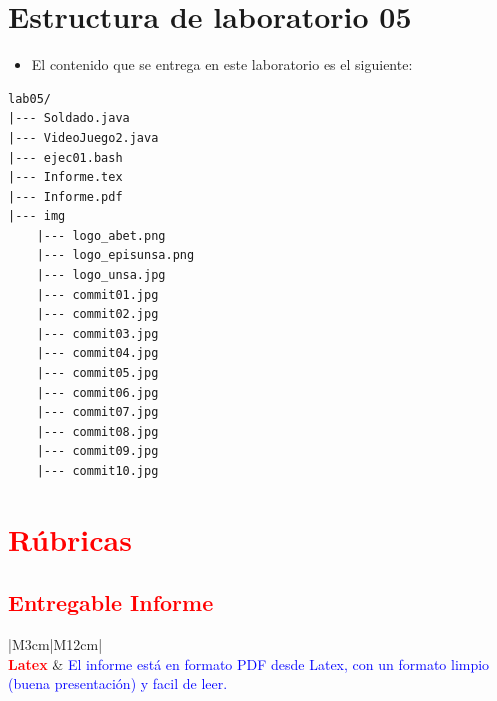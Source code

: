 \documentclass{article}
\newcommand{\itemPracticeNumber}{05}
\begin{document}
\section{Estructura de laboratorio \itemPracticeNumber}
\begin{itemize}
	\item El contenido que se entrega en este laboratorio es el siguiente:
\end{itemize}
\begin{lstlisting}[style=ascii-tree]
lab05/
|--- Soldado.java
|--- VideoJuego2.java
|--- ejec01.bash
|--- Informe.tex
|--- Informe.pdf
|--- img
	|--- logo_abet.png
	|--- logo_episunsa.png
	|--- logo_unsa.jpg
	|--- commit01.jpg
	|--- commit02.jpg
	|--- commit03.jpg
	|--- commit04.jpg
	|--- commit05.jpg
	|--- commit06.jpg
	|--- commit07.jpg
	|--- commit08.jpg
	|--- commit09.jpg
	|--- commit10.jpg
\end{lstlisting}
\pagebreak

\section{\textcolor{red}{Rúbricas}}

\subsection{\textcolor{red}{Entregable Informe}}
\begin{table}[H]
	\caption{Tipo de Informe}
	\setlength{\tabcolsep}{0.5em} %
	{\renewcommand{\arraystretch}{1.5}%
		\begin{tabular}{|M{3cm}|M{12cm}|}
			\hline
			                                                                                                      \\
			\hline
			\textbf{\textcolor{red}{Latex}} & \textcolor{blue}{El informe está en formato PDF desde Latex,  con un formato limpio (buena presentación) y facil de leer.} \\
			\hline
		\end{tabular}
	}
\end{table}
\end{document}
